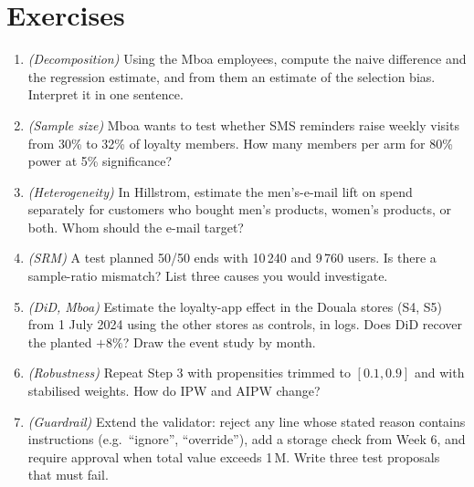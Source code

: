 \section{Exercises}
\begin{enumerate}[label=\textbf{7.\arabic*},leftmargin=2.4em]
\item \emph{(Decomposition)} Using the Mboa employees, compute the naive difference and the regression estimate, and
from them an estimate of the selection bias. Interpret it in one sentence.
\item \emph{(Sample size)} Mboa wants to test whether SMS reminders raise weekly visits from 30\% to 32\% of loyalty
members. How many members per arm for 80\% power at 5\% significance?
\item \emph{(Heterogeneity)} In Hillstrom, estimate the men's-e-mail lift on spend separately for customers who bought
men's products, women's products, or both. Whom should the e-mail target?
\item \emph{(SRM)} A test planned 50/50 ends with 10\,240 and 9\,760 users. Is there a sample-ratio mismatch? List three
causes you would investigate.
\item \emph{(DiD, Mboa)} Estimate the loyalty-app effect in the Douala stores (S4, S5) from 1 July 2024 using the other
stores as controls, in logs. Does DiD recover the planted $+8\%$? Draw the event study by month.
\item \emph{(Robustness)} Repeat Step 3 with propensities trimmed to $[0.1,0.9]$ and with stabilised weights. How do IPW
and AIPW change?
\item \emph{(Guardrail)} Extend the validator: reject any line whose stated reason contains instructions (e.g.\
``ignore'', ``override''), add a storage check from Week 6, and require approval when total value exceeds 1\,M\xaf.
Write three test proposals that must fail.
\end{enumerate}

